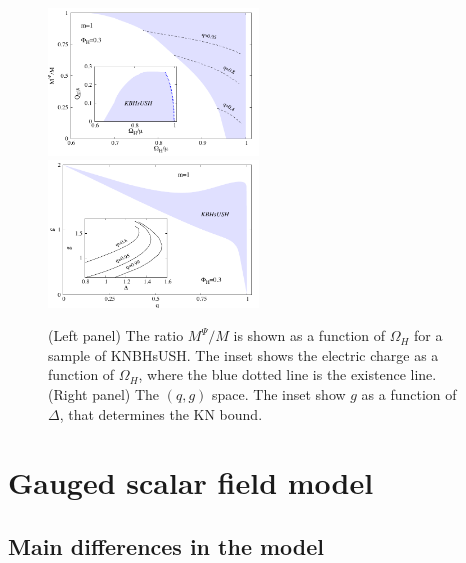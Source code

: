 \documentclass{article}
\begin{document}
\begin{figure}[H]
  \begin{center}
    \includegraphics[width=0.497\textwidth]{Mpsi}
      \includegraphics[width=0.497\textwidth]{qg}
  \end{center}
  \caption{(Left panel) The ratio $M^\Psi/M$ is shown as a function of $\Omega_H$ for a sample of KNBHsUSH. The inset shows the electric charge as a function of $\Omega_H$, where the blue dotted line is the existence line. 
	(Right panel)  The $(q,g)$ space. The inset show $g$ as a function of $\Delta$, that determines the KN bound.
}
 \label{fig:w-g} 
\end{figure}

 
 


\section{Gauged scalar field model}
\label{sec_mod_g}




\subsection{Main differences in the model}

\end{document}
